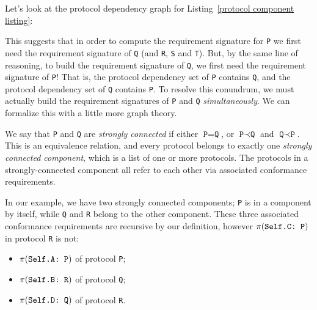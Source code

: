 \documentclass[../generics]{subfiles}
\begin{document}
Let's look at the protocol dependency graph for Listing~\ref{protocol component listing}:
\begin{quote}
\end{quote}
This suggests that in order to compute the requirement signature for \texttt{P} we first need the requirement signature of \texttt{Q} (and \texttt{R}, \texttt{S} and \texttt{T}). But, by the same line of reasoning, to build the requirement signature of \texttt{Q}, we first need the requirement signature of \texttt{P}! That is, the protocol dependency set of \texttt{P} contains \texttt{Q}, and the protocol dependency set of \texttt{Q} contains \texttt{P}. To resolve this conundrum, we must actually build the requirement signatures of \texttt{P} and \texttt{Q} \emph{simultaneously}. We can formalize this with a little more graph theory.

We say that \texttt{P} and \texttt{Q} are \emph{strongly connected} if either $\texttt{P}=\texttt{Q}$, or $\texttt{P}\prec\texttt{Q}$ and $\texttt{Q}\prec\texttt{P}$. This is an equivalence relation, and every protocol belongs to exactly one \emph{strongly connected component}, which is a list of one or more protocols. The protocols in a strongly-connected component all refer to each other via associated conformance requirements.

In our example, we have two strongly connected components; \verb|P| is in a component by itself, while \verb|Q| and \verb|R| belong to the other component. These three associated conformance requirements are recursive by our definition, however $\pi(\texttt{Self.C:~P})$ in protocol \verb|R| is not:
\begin{itemize}
\item $\pi(\texttt{Self.A:~P})$ of protocol \verb|P|;
\item $\pi(\texttt{Self.B:~R})$ of protocol \verb|Q|;
\item $\pi(\texttt{Self.D:~Q})$ of protocol \verb|R|.
\end{itemize}
\end{document}
